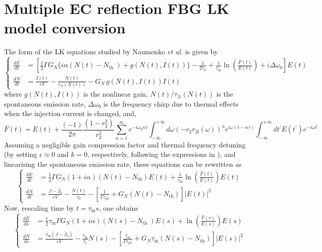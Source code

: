\section{Multiple EC reflection FBG LK model conversion}
\label{sec:multiple_EC_nondim}
%
The form of the LK equations studied by Naumenko \textit{et al.} \cite{naumenko2003characteristics,naumenko2004slow} is given by
\begin{equation}
\left\{\begin{aligned}
\frac{d E}{d t} &= \left[\frac{1}{2} \Gamma G_N \big\{ i \alpha\left(N(t)-N_{\text {th }}\right)+g(N(t), I(t)) \big\} - \frac{1}{2 \tau_\mu}+\frac{1}{\tau_\text{in}} \ln \left(\frac{\bar{F}(t)}{E(t)}\right)+i \Delta \omega_0\right] E(t)
\\
\frac{d N}{d t} &= \frac{I(t)}{e V}-\frac{N(t)}{\tau_N(N(t))}-G_N \, g(N(t), I(t)) I(t)
\end{aligned}\right.
\end{equation}
%
where $g(N(t), I(t))$ is the nonlinear gain, $N(t) / \tau_N(N(t))$ is the spontaneous emission rate, $\Delta \omega_0$ is the frequency chirp due to thermal effects when the injection current is changed, and,
%
\begin{equation}
\bar{F}(t)=  E(t)+\frac{(-1)}{2 \pi} \frac{\left(1-r_2^2\right)}{r_2^2} \sum_{n=1}^{\infty} e^{-i \omega_0 n \tau} \int_{-\infty}^{+\infty} d \omega\left(-r_2 r_B(\omega)\right)^n e^{i \omega(t-n \tau)} \int_{-\infty}^{+\infty} d t^{\prime} E\left(t^{\prime}\right) e^{-i \omega t^{\prime}}
\end{equation}
%
Assuming a negligible gain compression factor and thermal frequency detuning (by setting $\epsilon \approx 0$ and $k=0$, respectively, following the expressions in \cite{naumenko2003characteristics}), and linearising the spontaneous emission rate, these equations can be rewritten as
%
\begin{equation*}
\left\{\begin{aligned}
\frac{d E}{d t} &= \frac{1}{2} \Gamma G_N(1+i \alpha)\left(N(t)-N_\text{th}\right) E(t) + \frac{1}{\tau_\text{in}} \ln \left(\frac{\bar{F}(t)}{E(t)}\right) E(t) 
\\
\frac{d N}{d t} &= \frac{J-\bar{J}_0}{e V}-\frac{N(t)}{\tau_0}-\left[\frac{1}{\Gamma \tau_{p h}} + G_N\left(N(t)-N_\text{th}\right)\right]|E(t)|^2
\end{aligned}\right.
\end{equation*}
%
Now, rescaling time by $t=\tau_\text{in} s$, one obtains
%
\begin{equation*}
\left\{\begin{aligned}
\frac{d E}{d s} &= \frac{1}{2} \tau_\text{in} \Gamma G_N(1+i \alpha)\left(N(s)-N_{\text {th }}\right) E(s) + \ln \left(\frac{\bar{F}(s)}{E(s)}\right) E(s)
\\
\frac{d N}{d s} &= \frac{\tau_{\text{in}}\left(J-\bar{J}_0\right)}{e V}-\frac{\tau_\text{in}}{\tau_e} N(s)-\left[\frac{\tau_\text{in}}{\Gamma \tau_{ph}}+G_N \tau_\text{in}\left(N(s)-N_{\text{th}}\right)\right]|E(s)|^2
\end{aligned}\right.
\end{equation*}
